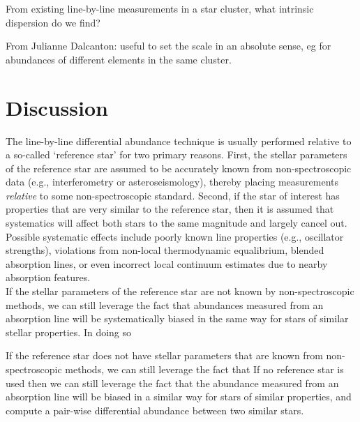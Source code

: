 \documentclass[modern]{aastex631}
\newcommand{\todo}[1]{\textcolor{tab:red}{#1}}
\begin{document}
\todo{From existing line-by-line measurements in a star cluster, what intrinsic dispersion do we find?}

\todo{From Julianne Dalcanton: useful to set the scale in an absolute sense, eg for abundances of different elements in the same cluster.}

\section{Discussion} \label{sec:discussion}

The line-by-line differential abundance technique \citep{Melendez:2009} is usually performed relative to a so-called `reference star' for two primary reasons. First, the stellar parameters of the reference star are assumed to be accurately known from non-spectroscopic data (e.g., interferometry or asteroseismology), thereby placing measurements \emph{relative} to some non-spectroscopic standard. Second, if the star of interest has properties that are very similar to the reference star, then it is assumed that systematics will affect both stars to the same magnitude and largely cancel out. Possible systematic effects include poorly known line properties (e.g., oscillator strengths), violations from non-local thermodynamic equalibrium, blended absorption lines, or even incorrect local continuum estimates due to nearby absorption features.\\

If the stellar parameters of the reference star are not known by non-spectroscopic methods, we can still leverage the fact that abundances measured from an absorption line will be systematically biased in the same way for stars of similar stellar properties. In doing so


If the reference star does not have stellar parameters that are known from non-spectroscopic methods, we can still leverage the fact that 
If no reference star is used then we can still leverage the fact that the abundance measured from an absorption line will be biased in a similar way for stars of similar properties, and compute a pair-wise differential abundance between two similar stars.\\
\end{document}
